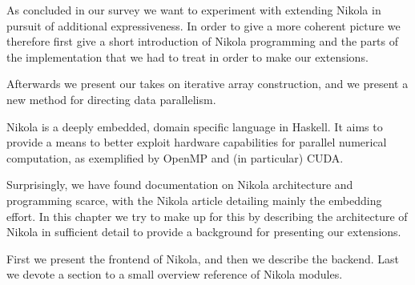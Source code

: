 As concluded in our survey we want to experiment with extending Nikola in
pursuit of additional expressiveness. In order to give a more coherent picture
we therefore first give a short introduction of Nikola programming and the
parts of the implementation that we had to treat in order to make our
extensions.

Afterwards we present our takes on iterative array construction, and we present
a new method for directing data parallelism.

Nikola is a deeply embedded, domain specific language in Haskell. It aims to
provide a means to better exploit hardware capabilities for parallel numerical
computation, as exemplified by OpenMP and (in particular) CUDA.

Surprisingly, we have found documentation on Nikola architecture and
programming scarce, with the Nikola article \cite{mainland2010nikola}
detailing mainly the embedding effort. In this chapter we try to make up for
this by describing the architecture of Nikola in sufficient detail to provide a
background for presenting our extensions.

First we present the frontend of Nikola, and then we describe the backend. Last
we devote a section to a small overview reference of Nikola modules.

